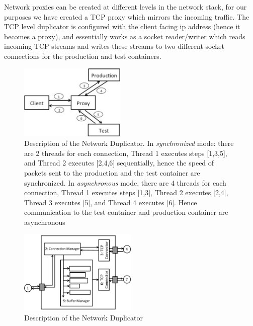 Network proxies can be created at different levels in the network stack, for our purposes we have created a TCP proxy which mirrors the incoming traffic.
The TCP level duplicator is configured with the client facing ip address (hence it becomes a proxy), and essentially works as a socket reader/writer which reads incoming TCP streams and writes these streams to two different socket connections for the production and test containers.

\begin{figure}[t]
  \begin{center}
    \includegraphics[width=0.45\textwidth]{figs/network_dup.eps}
    \caption{Description of the Network Duplicator. In \textit{synchronized} mode: there are 2 threads for each connection, Thread 1 executes steps [1,3,5], and Thread 2 executes [2,4,6] sequentially, hence the speed of packets sent to the production and the test container are synchronized. In \textit{asynchronous} mode, there are 4 threads for each connection, Thread 1 executes steps [1,3], Thread 2 executes [2,4], Thread 3 executes [5], and Thread 4 executes [6]. Hence communication to the test container and production container are asynchronous}
    \label{fig:duplicator}
  \end{center}
\end{figure}


\iffalse

\begin{figure}[t]
  \begin{center}
    \includegraphics[width=0.5\textwidth]{figs/duplicator.eps}
    \caption{Description of the Network Duplicator}
    \label{fig:duplicator}
  \end{center}
\end{figure}

